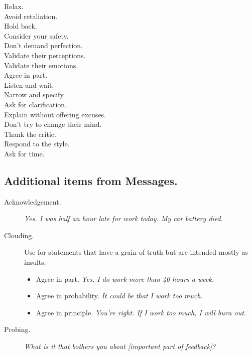 \documentclass{article}
\begin{document}
\begin{multicols}{3}
        \begin{description}
            \item[Relax.]
            \item[Avoid retaliation.]
            \item[Hold back.]
            \item[Consider your safety.]
            \item[Don't demand perfection.]
            \item[Validate their perceptions.]
            \item[Validate their emotions.]
            \item[Agree in part.]
            \item[Listen and wait.]
            \item[Narrow and specify. ]
            \item[Ask for clarification.]
            \item[Explain without offering excuses.]
            \item[Don't try to change their mind. ]
            \item[Thank the critic.]
            \item[Respond to the style.]
            \item[Ask for time.]
        \end{description}

     \subsection*{Additional items from Messages.}
 
         \begin{description}
             \item[Acknowledgement.] \emph{Yes. I was half an hour late for work today. My car battery died.}
             \item[Clouding.] Use for statements that have a grain of truth but are intended mostly as insults.
                 \begin{itemize}
                     \item Agree in part. \emph{Yes. I do work more than 40 hours a week.}
                     \item Agree in probability. \emph{It could be that I work too much.}
                     \item Agree in principle. \emph{You're right. If I work too much, I will burn out.}
                 \end{itemize}
             \item[Probing.] \emph{What is it that bothers you about [important part of feedback]?}
         \end{description}
 

\end{multicols}
\end{document}
